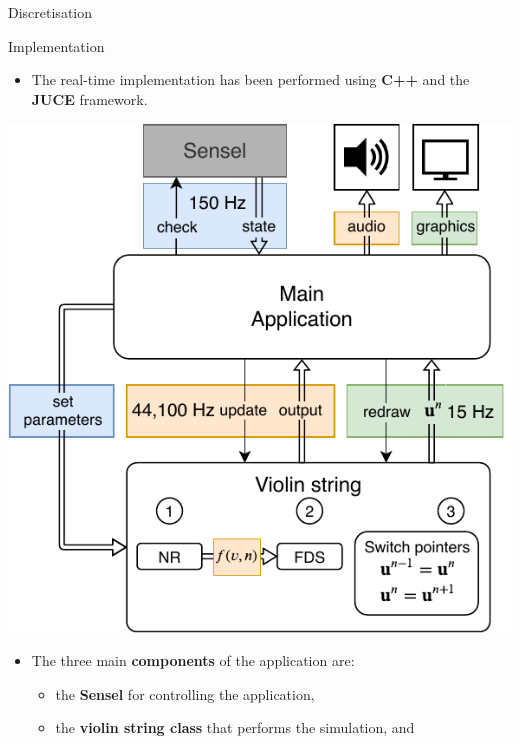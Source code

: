 \documentclass[a0paper,portrait]{baposter}
\let\oldbf\textbf
\renewcommand{\textbf}[1]{\textcolor{aaublue1}{\oldbf{#1}}}
\begin{document}
\begin{poster}
\begin{posterbox}[name=discretisation, column=1, below=elasto2,above=bottom]{Discretisation}
\end{posterbox}

\begin{posterbox}[name=implementation,column=2,row=0]{Implementation}

\begin{itemize}
    \item The real-time implementation has been performed using \textbf{C++} and the \textbf{JUCE} framework.
\end{itemize}
\begin{center}
    \includegraphics[width=1.0\columnwidth]{systemArchitecture.pdf}
    \label{fig:systemArch}
\end{center}
\begin{itemize}
    \item The three main \textbf{components} of the application are:
    \begin{itemize}
        \item the \textbf{Sensel} for controlling the application,
        \item the \textbf{violin string class} that performs the simulation, and

\end{itemize}
\end{itemize}
\end{posterbox}
\end{poster}
\end{document}
